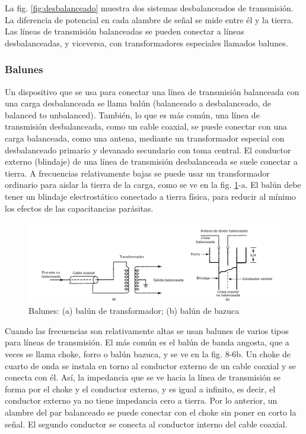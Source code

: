             La fig. \ref{fig:desbalanceado} muestra dos sistemas desbalanceados de transmisión. La diferencia de potencial en cada alambre de señal se mide entre él y la tierra. Las líneas de transmisión balanceadas se pueden conectar a líneas desbalanceadas, y viceversa, con transformadores especiales llamados balunes.

        \subsubsection{Balunes}

            Un dispositivo que se usa para conectar una línea de transmisión balanceada con una carga desbalanceada se llama balún (balanceado a desbalanceado, de balanced to unbalanced). También, lo que es más común, una línea de transmisión desbalanceada, como un cable coaxial, se puede conectar con una carga balanceada, como una antena, mediante un transformador especial con desbalanceado primario y devanado secundario con toma central. El conductor externo (blindaje) de una línea de transmisión desbalanceada se suele conectar a tierra. A frecuencias relativamente bajas se puede usar un transformador ordinario para aislar la tierra de la carga, como se ve en la fig. \ref{fig:balunes}-a. El balún debe tener un blindaje electrostático conectado a tierra física, para reducir al mínimo los efectos de las capacitancias parásitas.

            \begin{figure}[H]
                \centering
                \includegraphics[width=\textwidth]{imagenes/balunes.png}
                \caption{Balunes: (a) balún de transformador; (b) balún de bazuca}
                \label{fig:balunes}
            \end{figure}

            Cuando las frecuencias son relativamente altas se usan balunes de varios tipos para líneas de transmisión. El más común es el balún de banda angosta, que a veces se llama choke, forro o balún bazuca, y se ve en la fig. 8-6b. Un choke de cuarto de onda se instala en torno al conductor externo de un cable coaxial y se conecta con él. Así, la impedancia que se ve hacia la línea de transmisión se forma por el choke y el conductor externo, y es igual a infinito, es decir, el conductor externo ya no tiene impedancia cero a tierra. Por lo anterior, un alambre del par balanceado se puede conectar con el choke sin poner en corto la señal. El segundo conductor se conecta al conductor interno del cable coaxial.

